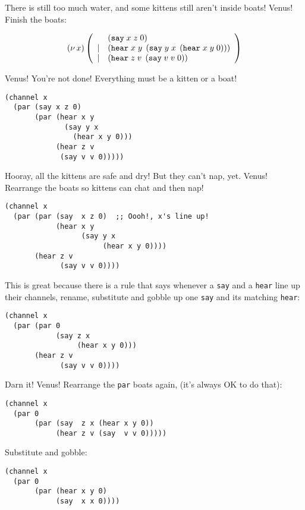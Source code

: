 \documentclass[10pt,oneside,x11names]{article}
\newcommand\napping    [0]{0}
\newcommand\whispering [2]{(\nu\,#1)\,{#2}}
\theoremstyle{definition}
\theoremstyle{warning}
\newcommand\say [3]{\left(\texttt{say}\thickspace{}#1\thickspace{}#2\thickspace{}#3\right)}
\newcommand\hear[3]{\left(\texttt{hear}\thickspace{}#1\thickspace{}#2\thickspace{}#3\right)}
\newcommand\kitA{\say{x}{z}{\napping}}
\newcommand\kitB{\hear{x}{y}{\say{y}{x}{\hear{x}{y}{\napping}}}}
\newcommand\kitC{\hear{z}{v}{\say{v}{v}{\napping}}}
\begin{document}
There is still too much water, and some kittens
still aren't inside boats! Venus! Finish the boats:

\begin{equation}
\whispering{x}{\left(
\begin{array}{clll}
 {}     & \kitA \\
 \vert  & \kitB \\
 \vert  & \kitC \\
\end{array}\right)}
\end{equation}

Venus! You're not done! Everything must be a kitten or a boat!

\vskip 0.26cm
\begin{verbatim}
(channel x
  (par (say x z 0)
       (par (hear x y
              (say y x
                (hear x y 0)))
            (hear z v
             (say v v 0)))))
\end{verbatim}

Hooray, all the kittens are safe and dry! But they can't nap, yet.
Venus! Rearrange the boats so kittens can chat and then nap!

\vskip 0.26cm
\begin{verbatim}
(channel x
  (par (par (say  x z 0)  ;; Oooh!, x's line up!
            (hear x y
                  (say y x
                       (hear x y 0))))
       (hear z v
             (say v v 0))))
\end{verbatim}

This is great because there is a rule that says whenever a
\texttt{say} and a \texttt{hear} line up their channels, rename, substitute
and gobble up one \texttt{say} and its matching \texttt{hear}:

\vskip 0.26cm
\begin{verbatim}
(channel x
  (par (par 0
            (say z x
                 (hear x y 0)))
       (hear z v
             (say v v 0))))
\end{verbatim}

Darn it! Venus! Rearrange the \texttt{par} boats again, (it's always OK to do
that):

\vskip 0.26cm
\begin{verbatim}
(channel x
  (par 0
       (par (say  z x (hear x y 0))
            (hear z v (say  v v 0)))))
\end{verbatim}

Substitute and gobble:

\vskip 0.26cm
\begin{verbatim}
(channel x
  (par 0
       (par (hear x y 0)
            (say  x x 0))))
\end{verbatim}
\end{document}
